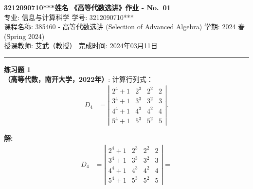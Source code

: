 \documentclass[a4paper, 11pt]{article}
\newenvironment{problem}[2][练习题]
    { \begin{mdframed}[backgroundcolor=gray!5] \textbf{#1 #2} \\}
    {  \end{mdframed}}
\newenvironment{solution}
    {\textbf{解:}}
    {}
\begin{document}
\noindent
\large\textbf{3212090710***\quad 姓名} \hfill \textbf{《高等代数选讲》作业 - No.~\Huge{01}}   \\
专业: 信息与计算科学 \hfill 学号: 3212090710*** \\
\normalsize 课程名称: 385460 - 高等代数选讲 (Selection of Advanced Algebra) \hfill 学期: 2024 春 (Spring 2024)\\
授课教师: 艾武（教授） \hfill 完成时间: 2024年03月11日 \\
\noindent\rule{7in}{1.8pt}

\begin{problem}{1}
\textbf{（高等代数，南开大学，2022年）}: 计算行列式：
\begin{align*}
D_{4} & = \left|\begin{array}{llll}
2^{4}+1 & 2^{3} & 2^{2} & 2 \\
3^{4}+1 & 3^{3} & 3^{2} & 3 \\
4^{4}+1 & 4^{3} & 4^{2} & 4 \\
5^{4}+1 & 5^{3} & 5^{2} & 5
\end{array}\right| .
\end{align*}
\end{problem}

\begin{solution}
\begin{align*}
D_{4} & = \left|\begin{array}{llll}
2^{4}+1 & 2^{3} & 2^{2} & 2 \\
3^{4}+1 & 3^{3} & 3^{2} & 3 \\
4^{4}+1 & 4^{3} & 4^{2} & 4 \\
5^{4}+1 & 5^{3} & 5^{2} & 5
\end{array}\right|
=
\end{align*}
\end{solution} 

\end{document}
